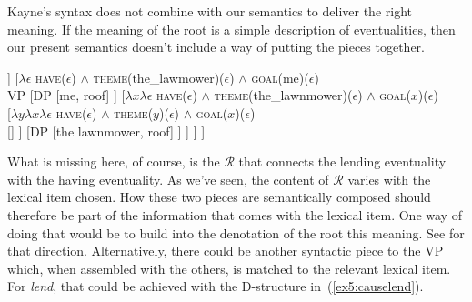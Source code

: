 Kayne's syntax does not combine with our semantics to deliver the right meaning. If the meaning of the root is a simple description of eventualities, then our present semantics doesn't include a way of putting the pieces together.
\medskip
\begin{fullwidth}
\begin{exe}
	\raggedright
	\ex \label{ex5:nosemill} 
	\small
	\begin{forest}
	[??\\ \ibar{V}
		[$\lambda \epsilon$ \textsc{lend}($\epsilon$)\\ \obar{V} [$\surd$lend]]
		[$\lambda \epsilon$ \textsc{have}($\epsilon$) $\wedge$ \textsc{theme}(the\_lawmower)($\epsilon$) $\wedge$ \textsc{goal}(me)($\epsilon$)\\ VP
			[DP [me, roof] ]
			[$\lambda x \lambda \epsilon$ \textsc{have}($\epsilon$) $\wedge$ \textsc{theme}(the\_lawnmower)($\epsilon$) $\wedge$ \textsc{goal}($x$)($\epsilon$)\\ 
				[$\lambda y \lambda x \lambda \epsilon$ \textsc{have}($\epsilon$) $\wedge$ \textsc{theme}($y$)($\epsilon$) $\wedge$ \textsc{goal}($x$)($\epsilon$)\\ [] ]
				[DP [the lawnmower, roof] ]
			]
		 ]
	]
	\end{forest}
\end{exe}
\end{fullwidth}
\medskip
What is missing here, of course, is the $\mathcal{R}$ that connects the lending eventuality with the having eventuality. As we've seen, the content of $\mathcal{R}$ varies with the lexical item chosen. How these two pieces are semantically composed should therefore be part of the information that comes with the lexical item. One way of doing that would be to build into the denotation of the root this meaning. See \citet{Beavers:2017,Beavers:2020} for that direction. Alternatively, there could be another syntactic piece to the VP which, when assembled with the others, is matched to the relevant lexical item. For \emph{lend}, that could be achieved with the D-structure in~(\ref{ex5:causelend}).
\medskip
